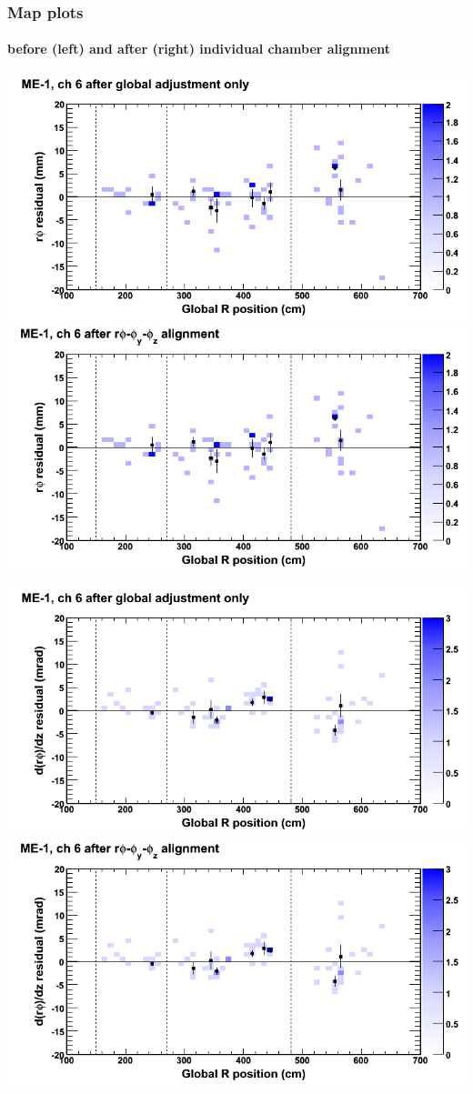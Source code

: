 \documentclass[compress]{beamer}
\begin{document}
\begin{frame}
\frametitle{Map plots}
\framesubtitle{before (left) and after (right) individual chamber alignment}
\includegraphics[width=0.5\linewidth]{ringmapplots_3dof/before_CSCvsr_mem1ch06_x.png} \includegraphics[width=0.5\linewidth]{ringmapplots_3dof/after_CSCvsr_mem1ch06_x.png}

\includegraphics[width=0.5\linewidth]{ringmapplots_3dof/before_CSCvsr_mem1ch06_dxdz.png} \includegraphics[width=0.5\linewidth]{ringmapplots_3dof/after_CSCvsr_mem1ch06_dxdz.png}
\end{frame}
\end{document}
